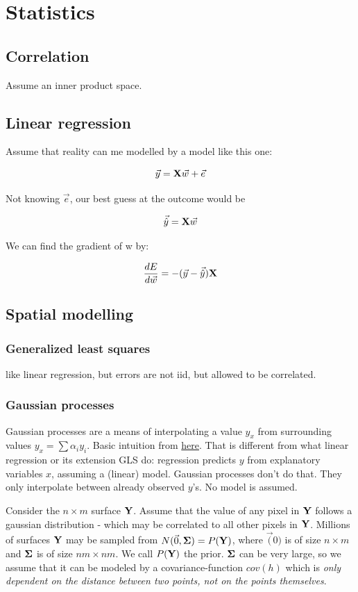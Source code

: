 \section{Statistics}

\subsection{Correlation}
Assume an inner product space.

\subsection{Linear regression}

Assume that reality can me modelled by a model like this one: 

$$ \vec{y} = \mathbf{X} \vec{w} + \vec{e} $$

Not knowing $\vec{e}$, our best guess at the outcome would be 

$$ \vec{\hat{y}} = \mathbf{X} \vec{w} $$

We can find the gradient of w by:

$$  \frac{ \mathop{dE} }{ \mathop{d\vec{w}} }  = -  (\vec{y} - \vec{\hat{y}}) \mathbf{X}  $$



\subsection{Spatial modelling}

\subsubsection{Generalized least squares}
like linear regression, but errors are not iid, but allowed to be correlated.

\subsubsection{Gaussian processes}
Gaussian processes are a means of interpolating a value $y_x$ from surrounding values $y_x = \sum \alpha_i y_i$. Basic intuition from \href{https://bookdown.org/rbg/surrogates/chap5.html}{here}.
That is different from what linear regression or its extension GLS do: regression predicts $y$ from explanatory variables $x$, assuming a (linear) model.
Gaussian processes don't do that. They only interpolate between already observed $y$'s. No model is assumed.

Consider the $n \times m$ surface $\mathbf{Y}$. Assume that the value of any pixel in $\mathbf{Y}$ follows a gaussian distribution - which may be correlated to all other pixels in $\mathbf{Y}$.
Millions of surfaces $\mathbf{Y}$ may be sampled from $N(\vec{0}, \mathbf{\Sigma}) = P(\mathbf{Y})$, where $\vec(0)$ is of size $n \times m$ and $\mathbf{\Sigma}$ is of size $nm \times nm$.
We call $P(\mathbf{Y})$ the prior. $\mathbf{\Sigma}$ can be very large, so we assume that it can be modeled by a covariance-function $cov(h)$ which is \emph{only dependent on the distance between two points, not on the points themselves}.

